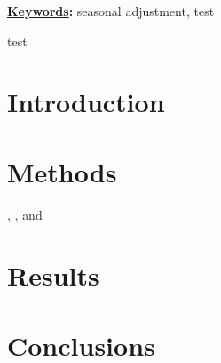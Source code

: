 \documentclass[
  12pt,
  ,
  a4paper]{article}
\title{
\vspace{-5ex}
\thetitle
\vspace{-2ex}
}
\author{
\theauthors
\vspace{-5ex}
}
\date{}
\date{}
\def\thekeywords{%
seasonal adjustment, test%
}
\begin{document}
\cfoot{\thepage} %
\sectionfont{\large\textsc}


\maketitle

{\fontsize{10pt}{12.0pt}\selectfont \textbf{\uline{Keywords}:} \thekeywords\par}\par


test

\hypertarget{introduction}{%
\section{Introduction}\label{introduction}}

\hypertarget{methods}{%
\section{Methods}\label{methods}}

\citet{proietti2008}, \citet{ch15HBSA}, \citet{trilemmaWMR2019} and \citet{dagumbianconcini2008}

\hypertarget{results}{%
\section{Results}\label{results}}

\hypertarget{conclusions}{%
\section{Conclusions}\label{conclusions}}

\renewcommand\refname{References}
  
\end{document}
